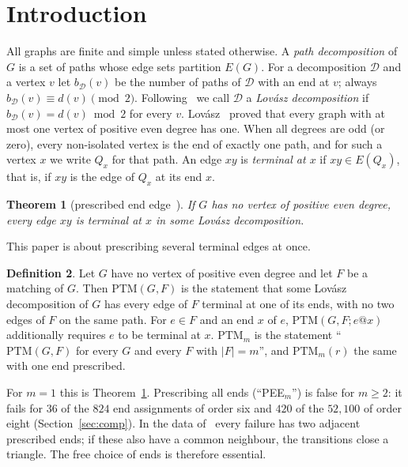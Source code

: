 \documentclass[11pt]{amsart}
\newtheorem{theorem}{Theorem}[section]
\theoremstyle{definition}
\newtheorem{definition}[theorem]{Definition}
\newcommand{\cD}{\mathcal D}
\newcommand{\PTM}{\mathrm{PTM}}
\begin{document}
\maketitle

\section{Introduction}\label{sec:intro}

All graphs are finite and simple unless stated otherwise. A \emph{path decomposition} of $G$ is
a set of paths whose edge sets partition $E(G)$. For a decomposition $\cD$ and a vertex $v$ let
$b_\cD(v)$ be the number of paths of $\cD$ with an end at $v$; always $b_\cD(v)\equiv d(v)\pmod
2$. Following~\cite{RD} we call $\cD$ a \emph{Lov\'asz decomposition} if $b_\cD(v)=d(v)\bmod 2$
for every $v$. Lov\'asz~\cite{L68} proved that every graph with at most one vertex of positive
even degree has one. When all degrees are odd (or zero), every non-isolated vertex is the end of
exactly one path, and for such a vertex $x$ we write $Q_x$ for that path. An edge $xy$ is
\emph{terminal at $x$} if $xy\in E(Q_x)$, that is, if $xy$ is the edge of $Q_x$ at its end $x$.

\begin{theorem}[prescribed end edge~\cite{MS}]\label{thm:endedge}
If $G$ has no vertex of positive even degree, every edge $xy$ is terminal at $x$ in some Lov\'asz
decomposition.
\end{theorem}

This paper is about prescribing several terminal edges at once.

\begin{definition}\label{def:ptm}
Let $G$ have no vertex of positive even degree and let $F$ be a matching of $G$. Then
$\PTM(G,F)$ is the statement that some Lov\'asz decomposition of $G$ has every edge of $F$
terminal at one of its ends, with no two edges of $F$ on the same path. For $e\in F$ and an end
$x$ of $e$, $\PTM(G,F;e@x)$ additionally requires $e$ to be terminal at $x$. \emph{$\PTM_m$} is
the statement ``$\PTM(G,F)$ for every $G$ and every $F$ with $|F|=m$'', and $\PTM_m(r)$ the same
with one end prescribed.
\end{definition}

For $m=1$ this is Theorem~\ref{thm:endedge}. Prescribing all ends (``PEE$_m$'') is false for
$m\ge2$: it fails for $36$ of the $824$ end assignments of order six and $420$ of the $52{,}100$ of
order eight (Section~\ref{sec:comp}). In the data of~\cite[Table~3]{STL} every failure has two
adjacent prescribed ends; if these also have a common neighbour, the transitions close a
triangle. The free choice of ends is therefore essential.
\end{document}
